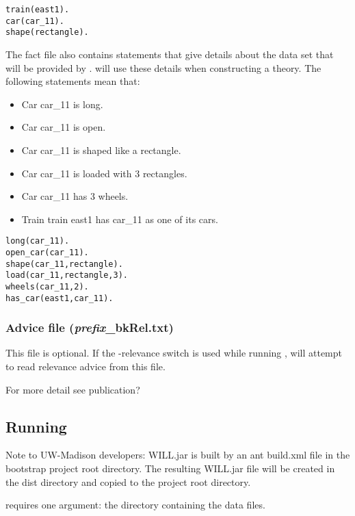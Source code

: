 \documentclass{article}
\begin{document}
\begin{verbatim}
train(east1). 
car(car_11).
shape(rectangle).
\end{verbatim}

The fact file also contains statements that give details about the data set that will be provided by \will.  \will will use these details when constructing a theory.  The following statements mean that:

\begin{itemize}
\item Car car\_11 is long.
\item Car car\_11 is open.
\item Car car\_11 is shaped like a rectangle.
\item Car car\_11 is loaded with 3 rectangles.
\item Car car\_11 has 3 wheels.
\item Train train east1 has car\_11 as one of its cars.
\end{itemize}

\begin{verbatim}
long(car_11).	
open_car(car_11).	
shape(car_11,rectangle). 
load(car_11,rectangle,3).
wheels(car_11,2).	
has_car(east1,car_11). 
\end{verbatim}


\subsubsection{Advice file (\emph{prefix}\_bkRel.txt)}

This file is optional.  If the -relevance switch is used while running \will, \will will attempt to read relevance advice from this file. \begin{rfc}For more detail see publication?\end{rfc}

\subsection{Running \will}

\begin{rfc}
Note to UW-Madison developers: WILL.jar is built by an ant build.xml file in the bootstrap project root directory.  The resulting WILL.jar file will be created in the dist directory and copied to the project root directory.
\end{rfc}

\will requires one argument: the directory containing the data files.  
\end{document}
